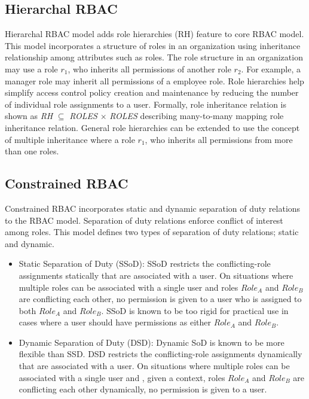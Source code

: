 \subsection{Hierarchal RBAC} 

Hierarchal RBAC model adds role hierarchies (RH) feature to core RBAC model.
This model incorporates a structure of roles in an organization using inheritance relationship among attributes such as roles.
The role structure in an organization may use
a role $r_1$, who inherits all permissions of another role $r_2$.
For example, a manager role may inherit all permissions of a employee role.
Role hierarchies help simplify access control policy creation and maintenance by reducing the number of
individual role assignments to a user. Formally, role inheritance relation is shown as \textit{RH} $\subseteq$ \textit{ROLES} $\times$ \textit{ROLES} describing many-to-many mapping role inheritance relation. 
General role hierarchies can be extended to use the concept of multiple inheritance where
a role $r_1$, who inherits all permissions from more than one roles.


\subsection{Constrained RBAC}

Constrained RBAC incorporates static and dynamic separation of duty relations to the RBAC model. Separation of 
duty relations enforce conflict of interest among roles. This model defines two types of separation of duty relations; static and dynamic.

\begin{itemize}
	\item Static Separation of Duty (SSoD): SSoD restricts the conflicting-role assignments statically that are associated with a user. On situations
	where multiple roles can be associated with a single user and roles $Role_A$ and $Role_B$ are conflicting each other, no permission is given to a user who is assigned to both $Role_A$ and $Role_B$. SSoD is known to be too rigid for practical use in cases where a user should have permissions as either $Role_A$ and $Role_B$.
	\item Dynamic Separation of Duty (DSD): Dynamic SoD is known to be
more flexible than SSD. DSD restricts the conflicting-role assignments dynamically that are associated with a user. On situations
	where multiple roles can be associated with a single user and , given a context, roles $Role_A$ and $Role_B$ are conflicting each other dynamically, no permission is given to a user.	
\end{itemize}
